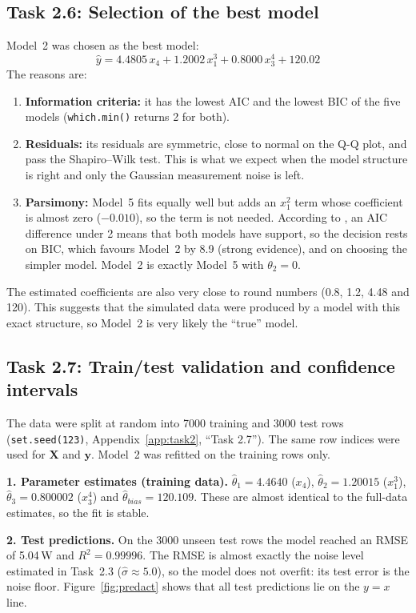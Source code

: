 \subsection{Task 2.6: Selection of the best model}
Model~2 was chosen as the best model:
\begin{equation}
\hat{y}=4.4805\,x_4+1.2002\,x_1^3+0.8000\,x_3^4+120.02
\label{eq:best}
\end{equation}
The reasons are:
\begin{enumerate}
  \item \textbf{Information criteria:} it has the lowest AIC and the lowest BIC of the five models (\texttt{which.min()} returns 2 for both).
  \item \textbf{Residuals:} its residuals are symmetric, close to normal on the Q-Q plot, and pass the Shapiro--Wilk test. This is what we expect when the model structure is right and only the Gaussian measurement noise is left.
  \item \textbf{Parsimony:} Model~5 fits equally well but adds an $x_1^2$ term whose coefficient is almost zero ($-0.010$), so the term is not needed. According to \citet{burnham2002}, an AIC difference under 2 means that both models have support, so the decision rests on BIC, which favours Model~2 by 8.9 (strong evidence), and on choosing the simpler model. Model~2 is exactly Model~5 with $\theta_2=0$.
\end{enumerate}
The estimated coefficients are also very close to round numbers (0.8, 1.2, 4.48 and 120). This suggests that the simulated data were produced by a model with this exact structure, so Model~2 is very likely the ``true'' model.

\subsection{Task 2.7: Train/test validation and confidence intervals}
The data were split at random into 7000 training and 3000 test rows (\texttt{set.seed(123)}, Appendix~\ref{app:task2}, ``Task 2.7''). The same row indices were used for $\mathbf{X}$ and $\mathbf{y}$. Model~2 was refitted on the training rows only.

\textbf{1. Parameter estimates (training data).} $\hat\theta_1=4.4640$ ($x_4$), $\hat\theta_2=1.20015$ ($x_1^3$), $\hat\theta_3=0.800002$ ($x_3^4$) and $\hat\theta_{bias}=120.109$. These are almost identical to the full-data estimates, so the fit is stable.

\textbf{2. Test predictions.} On the 3000 unseen test rows the model reached an RMSE of 5.04\,W and $R^2=0.99996$. The RMSE is almost exactly the noise level estimated in Task~2.3 ($\hat\sigma\approx5.0$), so the model does not overfit: its test error is the noise floor. Figure~\ref{fig:predact} shows that all test predictions lie on the $y=x$ line.


